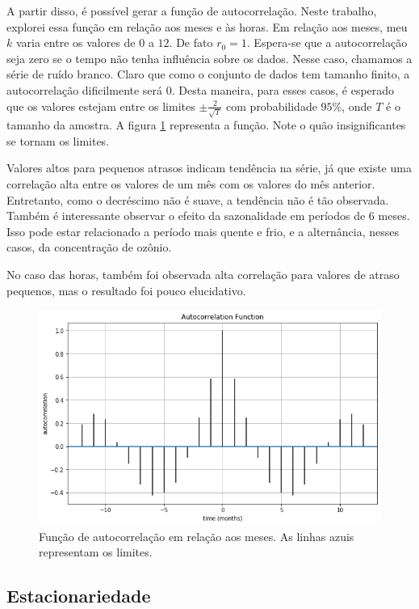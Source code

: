 A partir disso, é possível gerar a função de autocorrelação. Neste trabalho,
explorei essa função em relação aos meses e às horas. Em relação aos meses, meu
$k$ varia entre os valores de $0$ a $12$. De fato $r_0 = 1$. Espera-se que a
autocorrelação seja zero se o tempo não tenha influência sobre os dados. Nesse
caso, chamamos a série de ruído branco. Claro que como o conjunto de dados tem
tamanho finito, a autocorrelação dificilmente será $0$. Desta maneira, para
esses casos, é esperado que os valores estejam entre os limites $\pm
\frac{2}{\sqrt{T}}$ com probabilidade $95\%$, onde $T$ é o tamanho da amostra.
A figura \ref{acf-months} representa a função. Note o quão insignificantes se
tornam os limites. 

Valores altos para pequenos atrasos indicam tendência na série, já que
existe uma correlação alta entre os valores de um mês com os valores do mês
anterior. Entretanto, como o decréscimo não é suave, a tendência não é tão
observada. Também é interessante observar o efeito da sazonalidade em períodos
de 6 meses. Isso pode estar relacionado a período mais quente e frio, e a
alternância, nesses casos, da concentração de ozônio. 

No caso das horas, também foi observada alta correlação para valores de
atraso pequenos, mas o resultado foi pouco elucidativo. 

\begin{figure}  
    \includegraphics[width=\linewidth]{img/graphic3.png}
    \caption{Função de autocorrelação em relação aos meses. As linhas azuis
    representam os limites. }
    \label{acf-months}
\end{figure}

\subsection{Estacionariedade}

